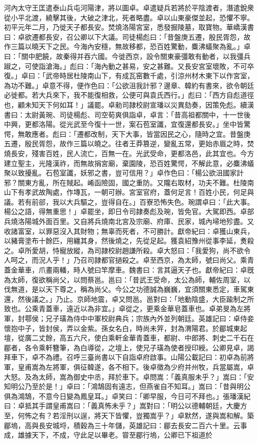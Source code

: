 \begin{pinyinscope}
河內太守王匡遣泰山兵屯河陽津，將以圖卓。卓遣疑兵若將於平陰渡者，潛遣銳衆從小平北渡，繞擊其後，大破之津北，死者略盡。卓以山東豪傑並起，恐懼不寧。初平元年二月，乃徙天子都長安。焚燒洛陽宮室，悉發掘陵墓，取寶物。華嶠漢書曰：卓欲遷都長安，召公卿以下大議。司徒楊彪曰：「昔盤庚五遷，殷民胥怨，故作三篇以曉天下之民。今海內安穩，無故移都，恐百姓驚動，麋沸蟻聚為亂。」卓曰：「關中肥饒，故秦得并吞六國。今徙西京，設令關東豪彊敢有動者，以我彊兵踧之，可使詣滄海。」彪曰：「海內動之甚易，安之甚難。又長安宮室壞敗，不可卒復。」卓曰：「武帝時居杜陵南山下，有成瓦窑數千處，引涼州材木東下以作宮室，為功不難。」卓意不得，便作色曰：「公欲沮我計邪？邊章、韓約有書來，欲令朝廷必徙都。若大兵來下，我不能復相救，公便可與袁氏西行。」彪曰：「西方自彪道徑也，顧未知天下何如耳！」議罷。卓勑司隷校尉宣璠以災異劾奏，因策免彪。續漢書曰：太尉黃琬、司徒楊彪、司空荀爽俱詣卓，卓言：「昔高祖都關中，十一世後中興，更都洛陽。從光武至今復十一世，案石苞室讖，宜復還都長安。」坐中皆驚愕，無敢應者。彪曰：「遷都改制，天下大事，皆當因民之心，隨時之宜。昔盤庚五遷，殷民胥怨，故作三篇以曉之。往者王莽篡逆，變亂五常，更始赤眉之時，焚燒長安，殘害百姓，民人流亡，百無一在。光武受命，更都洛邑，此其宜也。今方建立聖主，光隆漢祚，而無故捐宮廟，棄園陵，恐百姓驚愕，不解此意，必麋沸蟻聚以致擾亂。石苞室讖，妖邪之書，豈可信用？」卓作色曰：「楊公欲沮國家計邪？關東方亂，所在賊起。崤函險固，國之重防。又隴右取材，功夫不難。杜陵南山下有孝武故陶處，作塼瓦，一朝可辦。宮室官府，蓋何足言！百姓小民，何足與議。若有前郤，我以大兵驅之，豈得自在。」百寮恐怖失色。琬謂卓曰：「此大事。楊公之語，得無重思！」卓罷坐，即日令司隷奏彪及琬，皆免官。大駕即西。卓部兵燒洛陽城外面百里。又自將兵燒南北宮及宗廟、府庫、民家，城內埽地殄盡。又收諸富室，以罪惡沒入其財物；無辜而死者，不可勝計。獻帝紀曰：卓獲山東兵，以豬膏塗布十餘匹，用纏其身，然後燒之，先從足起。獲袁紹豫州從事李延，煑殺之。卓所愛胡，恃寵放縱，為司隷校尉趙謙所殺。卓大怒曰：「我愛狗，尚不欲令人呵之，而況人乎！」乃召司隷都官撾殺之。卓至西京，為太師，號曰尚父。乘青蓋金華車，爪畫兩轓，時人號曰竿摩車。魏書曰：言其逼天子也。獻帝紀曰：卓旣為太師，復欲稱尚父，以問蔡邕。邕曰：「昔武王受命，太公為師，輔佐周室，以伐無道，是以天下尊之，稱為尚父。今公之功德誠為巍巍，宜須關東悉定，車駕東還，然後議之。」乃止。京師地震，卓又問邕。邕對曰：「地動陰盛，大臣踰制之所致也。公乘青蓋車，遠近以為非宜。」卓從之，更乘金華皂蓋車也。卓弟旻為左將軍，封鄠侯；兄子璜為侍中中軍校尉典兵；宗族內外並列朝廷。英雄記曰：卓侍妾懷抱中子，皆封侯，弄以金紫。孫女名白，時尚未笄，封為渭陽君。於郿城東起壇，從廣二丈餘，高五六尺，使白乘軒金華青蓋車，都尉、中郎將、刺史二千石在郿者，各令乘軒簪筆，為白導從，之壇上，使兄子璜為使者授印綬。公卿見卓，謁拜車下，卓不為禮。召呼三臺尚書以下自詣卓府啟事。山陽公載記曰：初卓為前將軍，皇甫嵩為左將軍，俱征韓遂，各不相下。後卓徵為少府并州牧，兵當屬嵩，卓大怒。及為太師，嵩為御史中丞，拜於車下。卓問嵩：「義真服未乎？」嵩曰：「安知明公乃至於是！」卓曰：「鴻鵠固有遠志，但燕雀自不知耳。」嵩曰：「昔與明公俱為鴻鵠，不意今日變為鳳皇耳。」卓笑曰：「卿早服，今日可不拜也。」張璠漢紀曰：卓抵其手謂皇甫嵩曰：「義真怖未乎？」嵩對曰：「明公以德輔朝廷，大慶方至，何怖之有？若淫刑以逞，將天下皆懼，豈獨嵩乎？」卓默然，遂與嵩和解。築郿塢，高與長安城埒，積穀為三十年儲，英雄記曰：郿去長安二百六十里。云事成，雄據天下，不成，守此足以畢老。甞至郿行塢，公卿已下祖道於
\end{pinyinscope}
